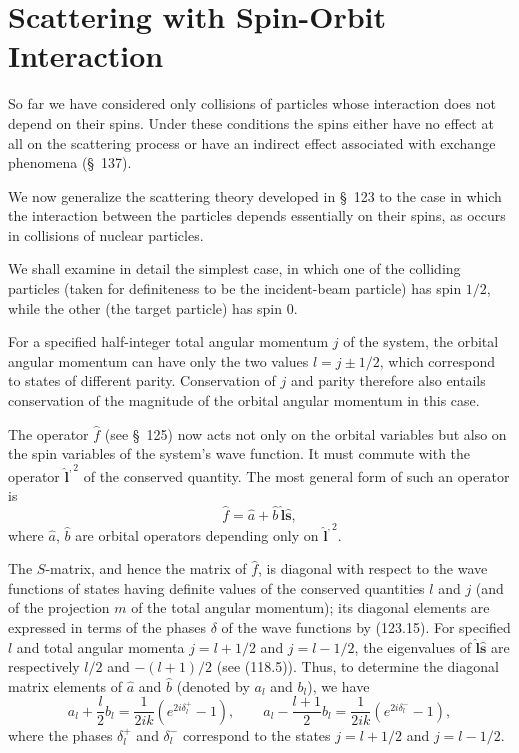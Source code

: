 \section{Scattering with Spin-Orbit Interaction}

So far we have considered only collisions of particles whose interaction does not depend on their spins. Under these conditions the spins either have no effect at all on the scattering process or have an indirect effect associated with exchange phenomena (\S~137).

We now generalize the scattering theory developed in \S~123 to the case in which the interaction between the particles depends essentially on their spins, as occurs in collisions of nuclear particles.

We shall examine in detail the simplest case, in which one of the colliding particles (taken for definiteness to be the incident-beam particle) has spin $1/2$, while the other (the target particle) has spin 0.

For a specified half-integer total angular momentum $j$ of the system, the orbital angular momentum can have only the two values $l=j\pm1/2$, which correspond to states of different parity. Conservation of $j$ and parity therefore also entails conservation of the magnitude of the orbital angular momentum in this case.

The operator $\hat f$ (see \S~125) now acts not only on the orbital variables but also on the spin variables of the system's wave function. It must commute with the operator $\hat{\mathbf l}^{,2}$ of the conserved quantity. The most general form of such an operator is
\begin{equation}\hat f=\hat a+\hat b\,\hat{\mathbf l}\hat{\mathbf s},\tag{140.1}\end{equation}
where $\hat a$, $\hat b$ are orbital operators depending only on $\hat{\mathbf l}^{,2}$.

The $S$-matrix, and hence the matrix of $\hat f$, is diagonal with respect to the wave functions of states having definite values of the conserved quantities $l$ and $j$ (and of the projection $m$ of the total angular momentum); its diagonal elements are expressed in terms of the phases $\delta$ of the wave functions by (123.15). For specified $l$ and total angular momenta $j=l+1/2$ and $j=l-1/2$, the eigenvalues of $\hat{\mathbf l}\hat{\mathbf s}$ are respectively $l/2$ and $-(l+1)/2$ (see (118.5)). Thus, to determine the diagonal matrix elements of $\hat a$ and $\hat b$ (denoted by $a_l$ and $b_l$), we have
\begin{equation}
 a_l+\frac l2b_l=\frac1{2ik}(e^{2i\delta_l^+}-1),\qquad
 a_l-\frac{l+1}{2}b_l=\frac1{2ik}(e^{2i\delta_l^-}-1),
 \tag{140.2}
\end{equation}
where the phases $\delta_l^+$ and $\delta_l^-$ correspond to the states $j=l+1/2$ and $j=l-1/2$.

